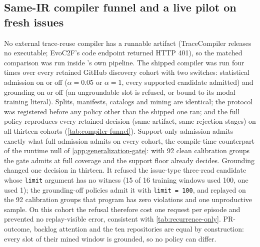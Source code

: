 \subsection{Same-IR compiler funnel and a live pilot on fresh issues}
\label{app:compiler-funnel}
No external trace-reuse compiler has a runnable artifact (TraceCompiler releases no
executable; EvoC2F's code endpoint returned HTTP 401), so the matched comparison was run
inside \method's own pipeline. The shipped compiler was run four times over every retained
GitHub discovery cohort with two switches: statistical admission on or off ($\alpha=0.05$ or
$\alpha=1$, every supported candidate admitted) and grounding on or off (an ungroundable slot
is refused, or bound to its modal training literal). Splits, manifests, catalogs and mining are
identical; the protocol was registered before any policy other than the shipped one ran; and
the full policy reproduces every retained decision (same artifact, same rejection stages) on
all thirteen cohorts (\cref{tab:compiler-funnel}). Support-only admission admits exactly what
full admission admits on every cohort, the compile-time counterpart of the runtime null of
\cref{app:generalization-gate}: with 92 clean calibration groups the gate admits at full
coverage and the support floor already decides. Grounding changed one decision in thirteen.
It refused the issue-type three-read candidate whose \texttt{limit} argument has no witness
(15 of 16 training windows used 100, one used 1); the grounding-off policies admit it with
\texttt{limit = 100}, and replayed on the 92 calibration groups that program has zero
violations and one unproductive sample. On this cohort the refusal therefore cost one request
per episode and prevented no replay-visible error, consistent with
\cref{tab:recurrence-only}. PR-outcome, backlog attention and the ten repositories are equal
by construction: every slot of their mined window is grounded, so no policy can differ.

\begin{table}[!h]
  \centering
  \caption{Same-IR compiler funnel over the thirteen retained GitHub discovery cohorts: the
  program each policy admits. ``2-read'' is the record-and-labels prefix, ``3-read'' adds the
  comments read. Replay counts are violations and unproductive samples among the 92 calibration
  groups of the divergent candidate.}
  \label{tab:compiler-funnel}
  \scriptsize
  \setlength{\tabcolsep}{3pt}
  \resizebox{\linewidth}{!}{}
\end{table}

